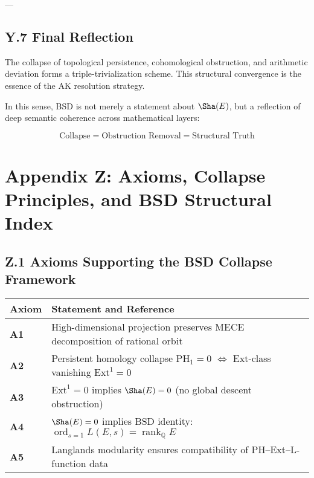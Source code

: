 ---

\subsection*{Y.7 Final Reflection}

The collapse of topological persistence, cohomological obstruction,  
and arithmetic deviation forms a triple-trivialization scheme.  
This structural convergence is the essence of the AK resolution strategy.

In this sense, BSD is not merely a statement about \( \Sha(E) \),  
but a reflection of deep semantic coherence across mathematical layers:

\[
\text{Collapse} = \text{Obstruction Removal} = \text{Structural Truth}
\]




\section*{Appendix Z: Axioms, Collapse Principles, and BSD Structural Index}

\subsection*{Z.1 Axioms Supporting the BSD Collapse Framework}

\begin{tabular}{ll}
\textbf{Axiom} & \textbf{Statement and Reference} \\
\hline
\textbf{A1} & High-dimensional projection preserves MECE decomposition of rational orbit \quad [Appendix C] \\
\textbf{A2} & Persistent homology collapse \( \mathrm{PH}_1 = 0 \) \( \Longleftrightarrow \) Ext-class vanishing \( \mathrm{Ext}^1 = 0 \) \quad [Appendix B$^+$, G.5, G.7, Y] \\
\textbf{A3} & \( \mathrm{Ext}^1 = 0 \) implies \( \Sha(E) = 0 \) (no global descent obstruction) \quad [Appendix H.4, Y] \\
\textbf{A4} & \( \Sha(E) = 0 \) implies BSD identity: \( \operatorname{ord}_{s=1} L(E,s) = \operatorname{rank}_\mathbb{Q} E \) \quad [Appendix I, Y] \\
\textbf{A5} & Langlands modularity ensures compatibility of PH–Ext–L-function data \quad [Appendix D] \\
\end{tabular}

